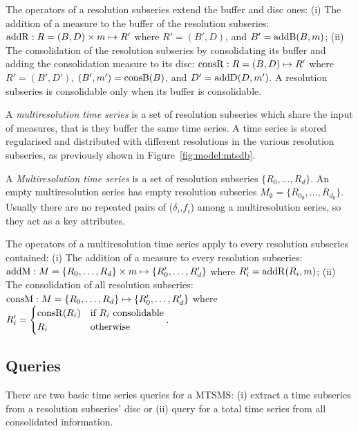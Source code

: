 The operators of a resolution subseries extend the buffer and disc
ones: (i) The addition of a measure to the buffer of the resolution
subseries: $\operatorname{addR} : R=(B,D) \times m \mapsto R'$ where $R'= (B',D)$,
and $B'= \operatorname{addB}(B,m)$; (ii) The consolidation of the resolution
subseries by consolidating its buffer and adding the consolidation
measure to its disc: $\operatorname{consR} : R=(B,D) \mapsto R'$ where $R'=
(B',D')$, $(B',m') = \operatorname{consB}(B)$, and $D'= \operatorname{addD}(D,m')$.  A resolution
subseries is consolidable only when its buffer is consolidable.




A \emph{multiresolution time series} is a set of resolution subseries
which share the input of measures, that is they buffer the same time
series. A time series is stored regularised and distributed with
different resolutions in the various resolution subseries, as
previously shown in Figure~\ref{fig:model:mtsdb}.
\begin{definition}
  A \emph{Mul\-ti\-re\-solution time series} is a set of resolution
  subseries $\{R_0, \dots, R_d\}$.  An empty multiresolution series
  has empty resolution subseries $M_{\emptyset}=\{R_{0_\emptyset},
  \dots, R_{d_\emptyset}\}$. Usually there are no repeated pairs of
  ($\delta_i$,$f_i$) among a multiresolution series, so they act as a
  key attributes.
\end{definition}

The operators of a multiresolution time series apply to every
resolution subseries contained: (i) The addition of a measure to every
resolution subseries: $\operatorname{addM} : M=\{R_0, \dots, R_d\} \times m \mapsto
\{R'_0, \dots, R'_d\}$ where $R'_i=\operatorname{addR}(R_i,m)$; (ii) The
consolidation of all resolution subseries: $\operatorname{consM} : M=\{R_0, \dots,
R_d\} \mapsto \{R'_0, \dots, R'_d\}$ where %
$ 
R'_i = \begin{cases}
  \operatorname{consR}(R_i) & \text{if } R_i \text{ consolidable} \\
  R_i                       & \text{otherwise}
\end{cases}
$.




\subsection{Queries}




There are two basic time series queries for a MTSMS: (i) extract a
time subseries from a resolution subseries' disc or (ii) query for a
total time series from all consolidated information.

